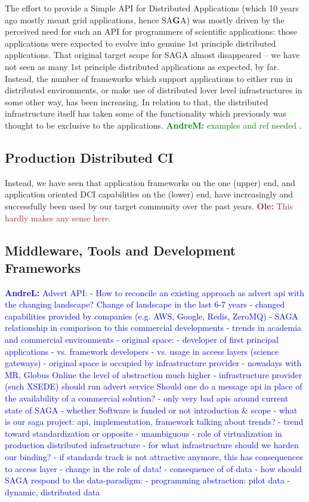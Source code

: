 \documentclass{article}
\newcommand{\B}[1]{\textbf{#1}}
\newcommand{\amnote}[1]{{\textcolor{green}{   \B{AndreM:  } #1 }}}
\newcommand{\alnote}[1]{{\textcolor{blue}{    \B{AndreL:  } #1 }}}
\newcommand{\ownote}[1]{{\textcolor{Brown}{   \B{Ole:     } #1 }}}
\newcommand{\amnote}[1]{}
\newcommand{\alnote}[1]{}
\newcommand{\ownote}[1]{}
\begin{document}
  The effort to provide a Simple API for Distributed Applications
  (which 10 years ago mostly meant grid applications, hence SA\B{G}A)
  was mostly driven by the perceived need for such an API for
  programmers of scientific applications: those applications were
  expected to evolve into genuine 1st principle distributed
  applications.  That original target scope for SAGA almost
  disappeared -- we have not seen as many 1st principle distributed
  applications as expected, by far.  Instead, the number of frameworks
  which support applications to either run in distributed
  environments, or make use of distributed lover level infrastructures
  in some other way, has been increasing.  In relation to that, the
  distributed infrastructure itself has taken some of the
  functionality which previously was thought to be exclusive to
  the applications. \amnote{examples and ref needed}.


 \subsection{Production Distributed CI}

  Instead, we have seen that application frameworks on the one (upper)
  end, and application oriented DCI capabilities on the (lower) end,
  have increasingly and successfully been used by our target community
  over the past years.
  \ownote{This hardly makes any sense here.}


 \subsection{Middleware, Tools and Development Frameworks}


\alnote{Advert API: - How to reconcile an existing approach as advert
  api with the changing landscape?  Change of landscape in the last
  6-7 years - changed capabilities provided by companies (e.g. AWS,
  Google, Redis, ZeroMQ) - SAGA relationship in comparison to this
  commercial developments - trends in academia and commercial
  environments - original space: - developer of first principal
  applications - vs. framework developers - vs. usage in access layers
  (science gateways) - original space is occupied by infrastructure
  provider - nowadays with MR, Globus Online the level of abstraction
  much higher - infrastructure provider (such XSEDE) should run advert
  service Should one do a message api in place of the availability of
  a commercial solution?  - only very bad apis around current state of
  SAGA - whether Software is funded or not introduction \& scope -
  what is our saga project: api, implementation, framework talking
  about trends?  - trend toward standardization or opposite -
  unambiguous - role of virtualization in production distributed
  infrastructure - for what infrastructure should we harden our
  binding?  - if standards track is not attractive anymore, this has
  consequences to access layer - change in the role of data!  -
  consequence of of data - how should SAGA respond to the
  data-paradigm: - programming abstraction: pilot data - dynamic,
  distributed data }
\end{document}
